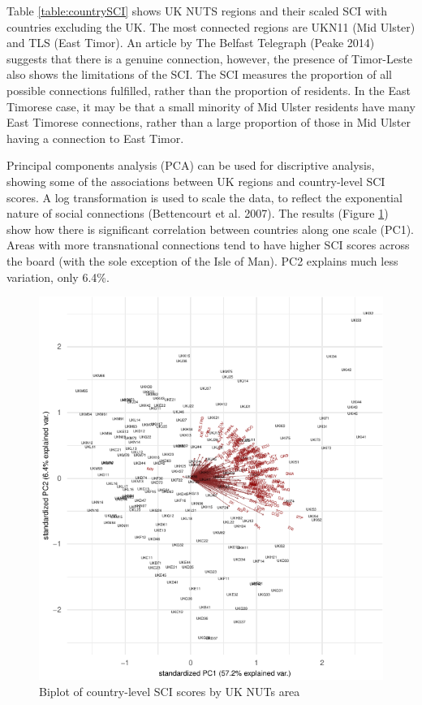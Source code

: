 \documentclass{article}
\begin{document}
Table \ref{table:countrySCI} shows UK NUTS regions and their scaled SCI
with countries excluding the UK. The most connected regions are UKN11
(Mid Ulster) and TLS (East Timor). An article by The Belfast Telegraph
(Peake 2014) suggests that there is a genuine connection, however, the
presence of Timor-Leste also shows the limitations of the SCI. The SCI
measures the proportion of all possible connections fulfilled, rather
than the proportion of residents. In the East Timorese case, it may be
that a small minority of Mid Ulster residents have many East Timorese
connections, rather than a large proportion of those in Mid Ulster
having a connection to East Timor.

Principal components analysis (PCA) can be used for discriptive
analysis, showing some of the associations between UK regions and
country-level SCI scores. A log transformation is used to scale the
data, to reflect the exponential nature of social connections
(Bettencourt et al. 2007). The results (Figure \ref{fig:biplot}) show
how there is significant correlation between countries along one scale
(PC1). Areas with more transnational connections tend to have higher SCI
scores across the board (with the sole exception of the Isle of Man).
PC2 explains much less variation, only 6.4\%.

\begin{figure}

{\centering \includegraphics[width=0.8\linewidth]{SCI-and-Leave-Voting_files/figure-latex/biplot-1} 

}

\caption{Biplot of country-level SCI scores by UK NUTs area}\label{fig:biplot}
\end{figure}
\end{document}
